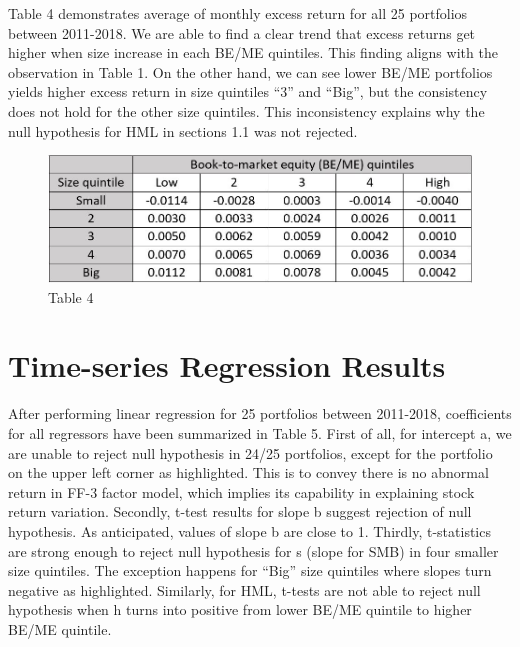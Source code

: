 \documentclass[12pt]{article}
\begin{document}
\noindent Table 4 demonstrates average of monthly excess return for all 25 portfolios between 2011-2018. We are able to find a clear trend that excess returns get higher when size increase in each BE/ME quintiles. This finding aligns with the observation in Table 1. On the other hand, we can see lower BE/ME portfolios yields higher excess return in size quintiles “3” and “Big”, but the consistency does not hold for the other size quintiles. This inconsistency explains why the null hypothesis for HML in sections 1.1 was not rejected.

\begin{figure}[h]
	\centering
	\includegraphics[width=0.55\linewidth]{4.JPG}
	\caption*{Table 4}
	\label{fig:label}
\end{figure}

\section{Time-series Regression Results}


After performing linear regression for 25 portfolios between 2011-2018, coefficients for all regressors have been summarized in Table 5. First of all, for intercept a, we are unable to reject null hypothesis in 24/25 portfolios, except for the portfolio on the upper left corner as highlighted. This is to convey there is no abnormal return in FF-3 factor model, which implies its capability in explaining stock return variation. Secondly, t-test results for slope b suggest rejection of null hypothesis. As anticipated, values of slope b are close to 1. Thirdly, t-statistics are strong enough to reject null hypothesis for s (slope for SMB) in four smaller size quintiles. The exception happens for “Big” size quintiles where slopes turn negative as highlighted. Similarly, for HML, t-tests are not able to reject null hypothesis when h turns into positive from lower BE/ME quintile to higher BE/ME quintile.
\end{document}
